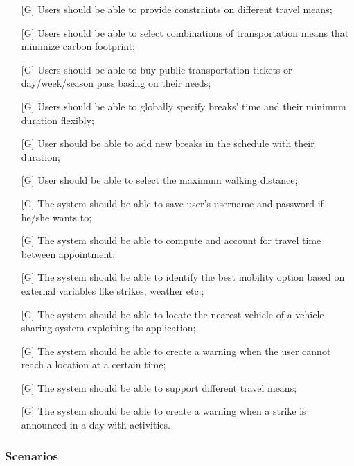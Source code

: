 \documentclass[12pt,titlepage]{article}
\begin{document}
\begin{itemize}
\item [{[G\ped{10}]}]		Users should be able to provide constraints on different travel means;
\item [{[G\ped{11}]}]		Users should be able to select combinations of transportation means that minimize carbon footprint;
\item [{[G\ped{12}]}]		Users should be able to buy public transportation tickets or day/week/season pass basing on their needs;
\item [{[G\ped{13}]}]		Users should be able to globally specify breaks' time and their minimum duration flexibly;
\item [{[G\ped{14}]}]		User should be able to add new breaks in the schedule with their duration;
\item [{[G\ped{15}]}]		User should be able to select the maximum walking distance;
\item [{[G\ped{16}]}]	The system should be able to save user's username and password if he/she wants to;
\item [{[G\ped{17}]}]		The system should be able to compute and account for travel time between appointment;
\item [{[G\ped{18}]}]		The system should be able to identify the best mobility option based on external variables like strikes, weather etc.;
\item [{[G\ped{19}]}]		The system should be able to locate the nearest vehicle of a vehicle sharing system exploiting its application;
\item [{[G\ped{20}]}]		The system should be able to create a warning when the user cannot reach a location at a certain time;
\item [{[G\ped{21}]}]		The system should be able to support different travel means;
\item [{[G\ped{22}]}]		The system should be able to create a warning when a strike is announced in a day with activities.
\end{itemize}
\subsubsection{Scenarios}\label{sec:mod1}
\end{document}
